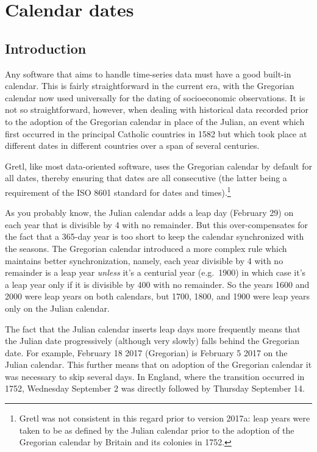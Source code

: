 \chapter{Calendar dates}
\label{chap:calendar}

\section{Introduction}
\label{cal-intro}

Any software that aims to handle time-series data must have a good
built-in calendar. This is fairly straightforward in the current era,
with the Gregorian calendar now used universally for the dating of
socioeconomic observations. It is not so straightforward, however,
when dealing with historical data recorded prior to the adoption of
the Gregorian calendar in place of the Julian, an event which first
occurred in the principal Catholic countries in 1582 but which took
place at different dates in different countries over a span of several
centuries.

Gretl, like most data-oriented software, uses the Gregorian calendar
by default for all dates, thereby ensuring that dates are all
consecutive (the latter being a requirement of the ISO 8601 standard
for dates and times).\footnote{Gretl was not consistent in this regard
  prior to version 2017a: leap years were taken to be as defined by
  the Julian calendar prior to the adoption of the Gregorian calendar
  by Britain and its colonies in 1752.}

As you probably know, the Julian calendar adds a leap day (February
29) on each year that is divisible by 4 with no remainder. But this
over-compensates for the fact that a 365-day year is too short to keep
the calendar synchronized with the seasons. The Gregorian calendar
introduced a more complex rule which maintains better synchronization,
namely, each year divisible by 4 with no remainder is a leap year
\textit{unless} it's a centurial year (e.g.\ 1900) in which case it's
a leap year only if it is divisible by 400 with no remainder.  So the
years 1600 and 2000 were leap years on both calendars, but 1700, 1800,
and 1900 were leap years only on the Julian calendar.

The fact that the Julian calendar inserts leap days more frequently
means that the Julian date progressively (although very slowly) falls
behind the Gregorian date. For example, February 18 2017 (Gregorian)
is February 5 2017 on the Julian calendar. This further means that on
adoption of the Gregorian calendar it was necessary to skip several
days. In England, where the transition occurred in 1752, Wednesday
September 2 was directly followed by Thursday September 14.


